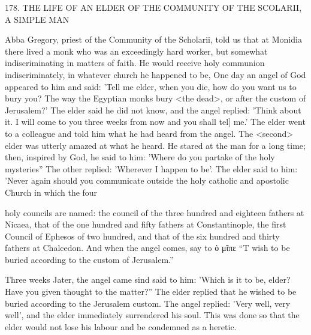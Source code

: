 178. THE LIFE OF AN ELDER OF THE
COMMUNITY OF THE SCOLARII, A SIMPLE MAN

Abba Gregory, priest of the Community of the Scholarii, told us
that at Monidia there lived a monk who was an exceedingly hard
worker, but somewhat indiscriminating in matters of faith. He
would receive holy communion indiscriminately, in whatever church
he happened to be, One day an angel of God appeared to him and
said: 'Tell me elder, when you die, how do you want us to bury
you? The way the Egyptian monks bury <the dead>, or after the
custom of Jerusalem?' The elder said he did not know, and the
angel replied: 'Think about it. I will come to you three weeks from
now and you shall tel] me.' The elder went to a colleague and told
him what he had heard from the angel. The <second> elder was
utterly amazed at what he heard. He stared at the man for a long
time; then, inspired by God, he said to him: 'Where do you partake
of the holy mysteries” The other replied: 'Wherever I happen to be'.
The elder said to him: 'Never again should you communicate
outside the holy catholic and apostolic Church in which the four

 

holy councils are named: the council of the three hundred and
eighteen fathers at Nicaea, that of the one hundred and fifty fathers
at Constantinople, the first Council of Ephesos of two hundred, and
that of the six hundred and thirty fathers at Chalcedon. And when
the angel comes, say to ὁ μῖπε “T wish to be buried according to the
custom of Jerusalem.”

Three weeks Jater, the angel came sind said to him: 'Which is it
to be, elder? Have you given thought to the matter?” The elder
replied that he wished to be buried according to the Jerusalem
custom. The angel replied: 'Very well, very well', and the elder
immediately surrendered his soul. This was done so that the elder
would not lose his labour and be condemned as a heretic.

